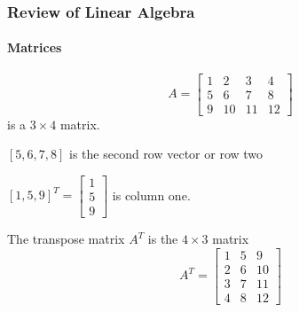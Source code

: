 \begin{frame}
\frametitle{Review of Linear Algebra}
\framesubtitle{Matrices}
\begin{examp}
$$
A = \left[\begin{array}{cccc}
1 & 2 & 3 & 4 \\
5 & 6 & 7 & 8 \\
9 & 10 & 11 & 12
\end{array}\right]
$$
is a $3\times 4$ matrix.

$[5,6,7,8]$ is the second row vector or {\bor row two}

$[1,5,9]^T = \left[\begin{array}{c} 1 \\ 5 \\ 9 \end{array}\right]$
is {\bor column one}.

The {\bor transpose matrix $A^T$} is the $4\times 3$ matrix
$$
A^T = \left[\begin{array}{ccc}
1 & 5 & 9 \\
2 & 6 & 10 \\
3 & 7 & 11\\
4 & 8 & 12
\end{array}\right]
$$
\end{examp}
\end{frame}

